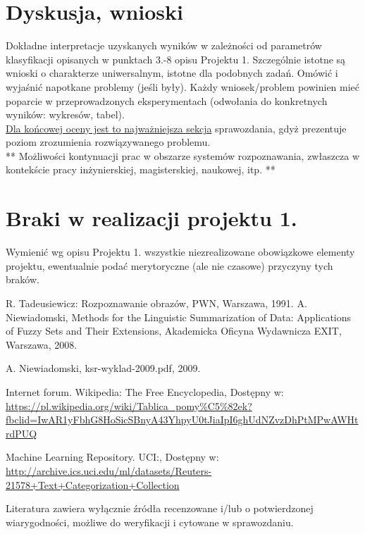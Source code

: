 \documentclass{classrep}
\begin{document}
\section{Dyskusja, wnioski}

Dokładne interpretacje uzyskanych wyników w zależności od parametrów klasyfikacji
opisanych w punktach 3.-8 opisu Projektu 1. 
Szczególnie istotne są wnioski o charakterze uniwersalnym, istotne dla podobnych zadań. 
Omówić i wyjaśnić napotkane problemy (jeśli były). Każdy wniosek/problem powinien mieć poparcie
w przeprowadzonych eksperymentach (odwołania do konkretnych wyników: wykresów,
tabel). \\
\underline{Dla końcowej oceny jest to najważniejsza sekcja} sprawozdania, gdyż prezentuje poziom
zrozumienia rozwiązywanego problemu.\\

** Możliwości kontynuacji prac w obszarze systemów rozpoznawania, zwłaszcza w kontekście pracy inżynierskiej,
magisterskiej, naukowej, itp. **\\



\section{Braki w realizacji projektu 1.}
Wymienić wg opisu Projektu 1. wszystkie niezrealizowane obowiązkowe elementy projektu, ewentualnie
podać merytoryczne (ale nie czasowe) przyczyny tych braków. 


\begin{thebibliography}{0}
 R. Tadeusiewicz: Rozpoznawanie obrazów, PWN, Warszawa, 1991.  
 A. Niewiadomski, Methods for the Linguistic Summarization of Data: Applications of Fuzzy Sets and Their Extensions, Akademicka Oficyna Wydawnicza EXIT, Warszawa, 2008.

 A. Niewiadomski, ksr-wyklad-2009.pdf, 2009.

 Internet forum. Wikipedia: The Free Encyclopedia, Dostępny w: \url{https://pl.wikipedia.org/wiki/Tablica_pomy%C5%82ek?fbclid=IwAR1yFbhG8HoSicSBnyA43YhpyU0tJiaIpI6ghUdNZvzDhPtMPwAWHtrdPUQ}

 Machine Learning Repository. UCI:, Dostępny w: \url{http://archive.ics.uci.edu/ml/datasets/Reuters-21578+Text+Categorization+Collection}

\end{thebibliography}

Literatura zawiera wyłącznie źródła recenzowane i/lub o potwierdzonej wiarygodności,
możliwe do weryfikacji i cytowane w sprawozdaniu. 
\end{document}
